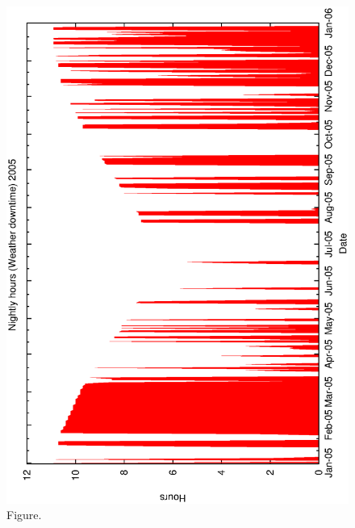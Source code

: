 \documentclass[12pt,a4paper]{article}
\begin{document}
\begin{figure}[htbp]
 \begin{center}
  \includegraphics[scale=1.0, angle=0]{figures/met_nightly_stats_weather2005.eps}
 \end{center}
  \caption[Figure.]
{Figure.}
\end{figure}
\clearpage
\end{document}
